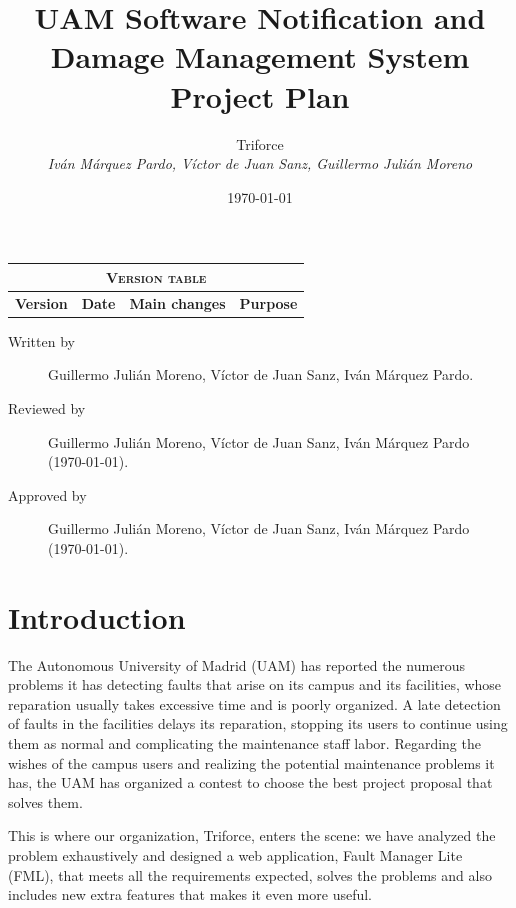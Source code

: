 \documentclass[11pt]{report}
\title{UAM Software Notification and Damage Management System \\ Project Plan}
\date{\today}
\author{{\Large Triforce} \\ \vspace{5pt} \textit{Iván Márquez Pardo, Víctor de Juan Sanz, Guillermo Julián Moreno}}
\begin{document}
\maketitle

\begin{table}[hbtp]
\centering
\begin{tabular}{|c|c|p{3cm}|p{3.5cm}|}
\hline \multicolumn{4}{|c|}{\textsc{Version table}} \\ \hline \hline
\textbf{Version} & \textbf{Date} & \textbf{Main changes} & \textbf{Purpose} \\ \hline
\end{tabular}
\end{table}

\begin{description}
\item[Written by] Guillermo Julián Moreno, Víctor de Juan Sanz, Iván Márquez Pardo.
\item[Reviewed by] Guillermo Julián Moreno, Víctor de Juan Sanz, Iván Márquez Pardo (\today).
\item[Approved by] Guillermo Julián Moreno, Víctor de Juan Sanz, Iván Márquez Pardo (\today).
\end{description}

\newpage

\begin{abstract}
\end{abstract}

\tableofcontents
\newpage
\listoftables
\newpage

\pagestyle{plain}

\chapter{Introduction}
\label{chapIntroduction}

The Autonomous University of Madrid (UAM) has reported the numerous problems it has detecting faults that arise on its campus and its facilities, whose reparation usually takes excessive time and is poorly organized. A late detection of faults in the facilities delays its reparation, stopping its users to continue using them as normal and complicating the maintenance staff labor. Regarding the wishes of the campus users and realizing the potential maintenance problems it has, the UAM has organized a contest to choose the best project proposal that solves them.

This is where our organization, Triforce, enters the scene: we have analyzed the problem exhaustively and designed a web application, Fault Manager Lite (FML), that meets all the requirements expected, solves the problems and also includes new extra features that makes it even more useful.
\end{document}
